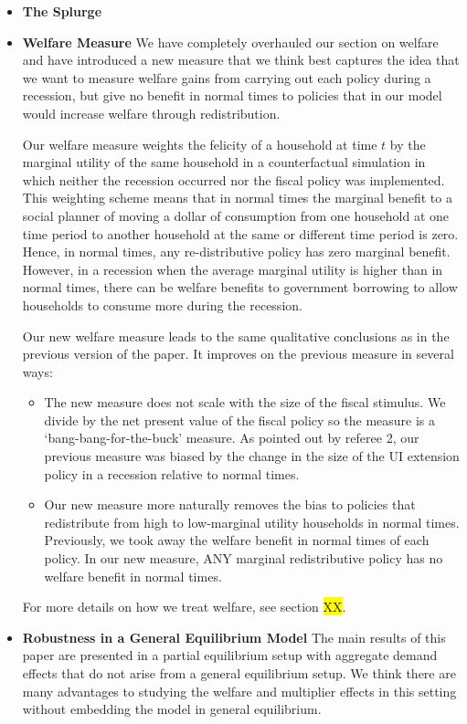 \begin{itemize}
	\item \textbf{The Splurge}
	\item \textbf{Welfare Measure} We have completely overhauled our section on welfare and have introduced a new measure that we think best captures the idea that we want to measure welfare gains from carrying out each policy during a recession, but give no benefit in normal times to policies that in our model would increase welfare through redistribution. 
	
	Our welfare measure weights the felicity of a household at time $t$ by the marginal utility of the same household in a counterfactual simulation in which neither the recession occurred nor the fiscal policy was implemented. This weighting scheme means that in normal times the marginal benefit to a social planner of moving a dollar of consumption from one household at one time period to another household at the same or different time period is zero. Hence, in normal times, any re-distributive policy has zero marginal benefit. However, in a recession when the average marginal utility is higher than in normal times, there can be welfare benefits to government borrowing to allow households to consume more during the recession.
	
	Our new welfare measure leads to the same qualitative conclusions as in the previous version of the paper. It improves on the previous measure in several ways:
	\begin{itemize}
		\item The new measure does not scale with the size of the fiscal stimulus. We divide by the net present value of the fiscal policy so the measure is a `bang-bang-for-the-buck' measure. As pointed out by referee 2, our previous measure was biased by the change in the size of the UI extension policy in a recession relative to normal times.
		\item Our new measure more naturally removes the bias to policies that redistribute from high to low-marginal utility households in normal times. Previously, we took away the welfare benefit in normal times of each policy. In our new measure, ANY marginal redistributive policy has no welfare benefit in normal times.
	\end{itemize}
	For more details on how we treat welfare, see section \colorbox{yellow}{XX}.
	
	\item \textbf{Robustness in a General Equilibrium Model}  The main results of this paper are presented in a partial equilibrium setup with aggregate demand effects that do not arise from a general equilibrium setup. We think there are many advantages to studying the welfare and multiplier effects in this setting without embedding the model in general equilibrium.
	

\end{itemize}
